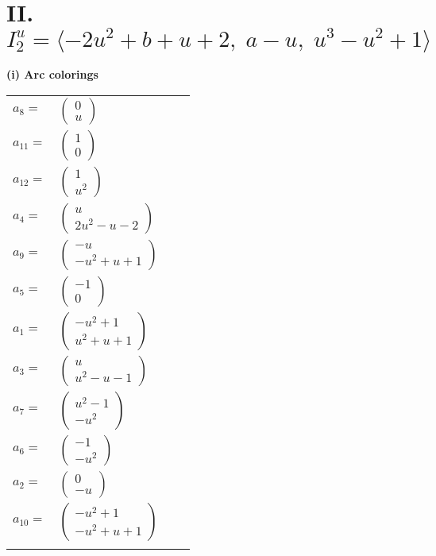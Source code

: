 \documentclass[1p]{elsarticle_modified}
\theoremstyle{definition}
\begin{document}
\centering \section*{II. $I^u_{2}= \langle -2 u^2+b+u+2,\;a- u,\;u^3- u^2+1 \rangle$}
\flushleft \textbf{(i) Arc colorings}\\
\begin{tabular}{m{7pt} m{180pt} m{7pt} m{180pt} }
\flushright $a_{8}=$&$\begin{pmatrix}0\\u\end{pmatrix}$ \\
\flushright $a_{11}=$&$\begin{pmatrix}1\\0\end{pmatrix}$ \\
\flushright $a_{12}=$&$\begin{pmatrix}1\\u^2\end{pmatrix}$ \\
\flushright $a_{4}=$&$\begin{pmatrix}u\\2 u^2- u-2\end{pmatrix}$ \\
\flushright $a_{9}=$&$\begin{pmatrix}- u\\- u^2+u+1\end{pmatrix}$ \\
\flushright $a_{5}=$&$\begin{pmatrix}-1\\0\end{pmatrix}$ \\
\flushright $a_{1}=$&$\begin{pmatrix}- u^2+1\\u^2+u+1\end{pmatrix}$ \\
\flushright $a_{3}=$&$\begin{pmatrix}u\\u^2- u-1\end{pmatrix}$ \\
\flushright $a_{7}=$&$\begin{pmatrix}u^2-1\\- u^2\end{pmatrix}$ \\
\flushright $a_{6}=$&$\begin{pmatrix}-1\\- u^2\end{pmatrix}$ \\
\flushright $a_{2}=$&$\begin{pmatrix}0\\- u\end{pmatrix}$ \\
\flushright $a_{10}=$&$\begin{pmatrix}- u^2+1\\- u^2+u+1\end{pmatrix}$\\&\end{tabular}
\end{document}
